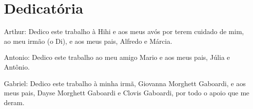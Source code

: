 \chapter*{Dedicatória}

\noindent 
Arthur:
Dedico este trabalho à Hihi e aos meus avós por terem cuidado de mim, ao meu irmão (o Di), e aos meus pais, Alfredo e Márcia.

\noindent 
Antonio:
Dedico este trabalho ao meu amigo Mario e aos meus pais, Júlia e Antônio.

\noindent 
Gabriel:
Dedico este trabalho à minha irmã, Giovanna Morghett Gaboardi, e aos meus pais, Dayse Morghett Gaboardi e Clovis Gaboardi, por todo o apoio que me deram.